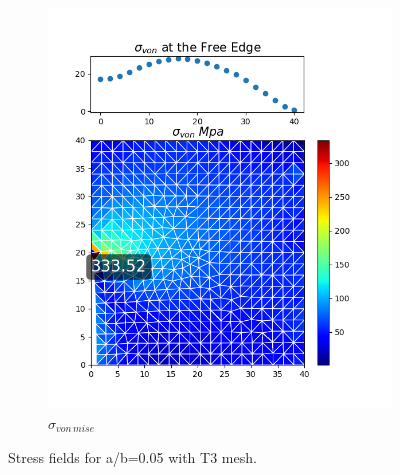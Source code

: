 \documentclass[twoside,twocolumn,10pt]{article}
\begin{document}
\begin{figure}[!ht]
\begin{subfigure}[c]{0.26\textwidth}
    \includegraphics[width=1.\linewidth]{Q2_5/Q5_0.05_von_triangle.png}
    \caption{$\sigma_{von \, mise}$}
    \label{fig:von_triangle_0.05}
  \end{subfigure}
  \caption{Stress fields for a/b=0.05 with T3 mesh.}
  \label{fig:triangle_0.05}
\end{figure}
\end{document}
